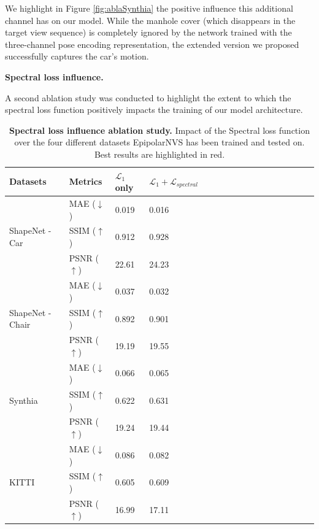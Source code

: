 We highlight in Figure \ref{fig:ablaSynthia} the positive influence this additional channel has on our model. While the manhole cover (which disappears in the target view sequence) is completely  ignored by the network trained with the three-channel pose encoding representation, the extended version we proposed successfully captures the car's motion.\newline 

\textbf{Spectral loss influence.}

A second ablation study was conducted to highlight the extent to which the spectral loss function positively impacts the training of our model architecture. 
\begin{table}[h!]
    \caption{\textbf{Spectral loss influence ablation study.} Impact of the Spectral loss function over the four different datasets EpipolarNVS has been trained and tested on.  Best results are highlighted in \colorbox{red!25}{red}.}
    \label{tab:spectral}
\begin{center}
\begin{tabular}{@{}||lllllllllllllllll@{}}
  \toprule
  Datasets & Metrics  &$\mathcal{L}_{1}$ only  &  $\mathcal{L}_{1}+\mathcal{L}_{spectral}$ &   \\
  \midrule
  \multirow{3}{*}{ShapeNet - Car \citep{chang2015shapenet}} & MAE ($\downarrow$) &\hfil 0.019 & \hfil  \cellcolor{red!25}0.016 \\
  & SSIM ($\uparrow$) & \hfil0.912 &  \cellcolor{red!25}0.928\\
  & PSNR ($\uparrow$)& \hfil22.61 & \hfil \cellcolor{red!25}24.23\\
  \midrule
  \multirow{3}{*}{ShapeNet - Chair \citep{chang2015shapenet}} & MAE ($\downarrow$) & \hfil 0.037 & \hfil \cellcolor{red!25}0.032\\
  & SSIM ($\uparrow$)&\hfil 0.892 & \hfil \cellcolor{red!25}0.901 \\
  & PSNR ($\uparrow$) & \hfil 19.19 & \hfil \cellcolor{red!25}19.55 \\
  \midrule
  \multirow{3}{*}{Synthia \citep{ros2016synthia}} & MAE ($\downarrow$)& \hfil 0.066 & \hfil \cellcolor{red!25}0.065\\
  & SSIM ($\uparrow$)& \hfil 0.622 & \hfil \cellcolor{red!25}0.631 \\
  & PSNR ($\uparrow$)& \hfil 19.24 & \hfil \cellcolor{red!25}19.44\\
  \midrule
  \multirow{3}{*}{KITTI \citep{geiger2012we}} & MAE ($\downarrow$)& \hfil 0.086 & \hfil \cellcolor{red!25}0.082\\
  & SSIM ($\uparrow$)& \hfil 0.605 & \hfil \cellcolor{red!25}0.609 \\
  & PSNR ($\uparrow$)& \hfil 16.99 & \hfil \cellcolor{red!25}17.11\\\hline
\end{tabular}
\end{center}
\end{table}

